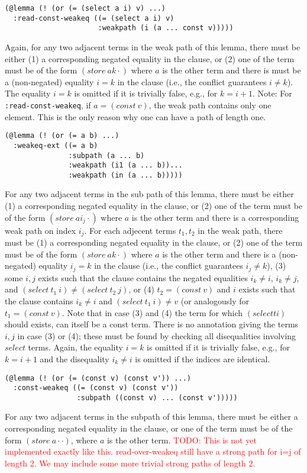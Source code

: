 \documentclass[a4paper]{article}
\newcommand\todo[1]{\textcolor{red}{TODO: #1}}
\begin{document}
\begin{verbatim}
(@lemma (! (or (= (select a i) v) ...)
  :read-const-weakeq ((= (select a i) v)
                      :weakpath (i (a ... const v)))))
\end{verbatim}
Again, for any two adjacent terms in the weak path of this lemma, there must be either
(1) a corresponding negated equality in the clause, or (2) one of the term must be of
the form $(store\ a k \cdot)$ where $a$ is the other term and there is must be
a (non-negated) equality $i=k$ in the clause (i.e., the conflict guarantees $i\neq k$).
The equality $i=k$ is omitted if it is trivially false, e.g., for $k = i+1$.
Note: For \verb+:read-const-weakeq+, if $a = (const\ v)$, the weak path
contains only one element.  This is the only reason why one can have a
path of length one.
\begin{verbatim}
(@lemma (! (or (= a b) ...)
  :weakeq-ext ((= a b)
               :subpath (a ... b)
               :weakpath (i1 (a ... b))...
               :weakpath (in (a ... b)))))
\end{verbatim}
For any two adjacent terms in the sub path of this lemma, there must be either
(1) a corresponding negated equality in the clause, or (2) one of the term must be of
the form $(store\ a i_j \cdot)$ where $a$ is the other term and there is a corresponding
weak path on index $i_j$.  For each adjecent terms $t_1,t_2$ in the weak path, there must be
(1) a corresponding negated equality in the clause, or (2) one of the term must be of
the form $(store\ a k \cdot)$ where $a$ is the other term and there is a
(non-negated) equality $i_j=k$ in the clause (i.e., the conflict guarantees $i_j\neq k$),
(3) some $i,j$ exists such that the clause contains the negated equalities
$i_k\neq i$, $i_k\neq j$, and $(select\ t_1\ i) \neq (select\ t_2\ j)$, or
(4) $t_2 = (const\ v)$ and $i$ exists such that the clause contains
$i_k\neq i$ and $(select\ t_1\ i) \neq v$ (or analogously for $t_1=(const\ v)$.
Note that in case (3) and (4) the term for which $(select t i)$ should exists, can itself
be a const term.  There is no annotation giving the terms $i,j$ in case (3) or (4); these
must be found by checking all disequalities involving $select$ terms.
Again, the equality $i=k$ is omitted if it is trivially false, e.g., for $k = i+1$ and the
disequality $i_k \neq i$ is omitted if the indices are identical.

\begin{verbatim}
(@lemma (! (or (= (const v) (const v')) ...)
  :const-weakeq ((= (const v) (const v'))
                 :subpath ((const v) ... (const v')))))
\end{verbatim}
For any two adjacent terms in the subpath of this lemma, there must be either
a corresponding negated equality in the clause, or one of the term must be of
the form $(store\ a \cdot \cdot)$, where $a$ is the other term.
\todo{This is not yet implemented exactly like this.  read-over-weakeq
  still have a strong path for i=j of length 2.  We may include some more
  trivial strong paths of length 2.}
\end{document}
